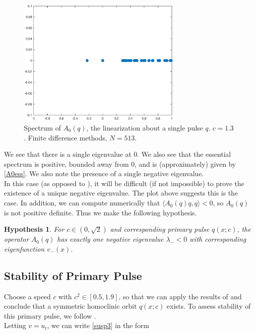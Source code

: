 \documentclass[12pt]{article}
\newtheorem{hypothesis}{Hypothesis}
\begin{document}
\begin{figure}[H]
\centering
\includegraphics[width=8cm]{specA0.eps}
\caption{Spectrum of $A_0(q)$, the linearization about a single pulse $q$. $c = 1.3$. Finite difference methods, $N = 513$.}
\end{figure}

We see that there is a single eigenvalue at 0. We also see that the essential spectrum is positive, bounded away from 0, and is (approximately) given by \eqref{A0ess}. We also note the presence of a single negative eigenvalue.\\

In this case (as opposed to \cite{Sandstede1997}), it will be difficult (if not impossible) to prove the existence of a unique negative eigenvalue. The plot above suggests this is the case. In addition, we can compute numerically that $\langle A_0(q) q, q \rangle < 0$, so $A_0(q)$ is not positive definite. Thus we make the following hypothesis.

\begin{hypothesis}\label{A0neg}
For $c \in (0, \sqrt{2})$ and corresponding primary pulse $q(x; c)$, the operator $A_0(q)$ has exactly one negative eigenvalue $\lambda_- < 0$ with corresponding eigenfunction $v_-(x)$.
\end{hypothesis}

\subsection{Stability of Primary Pulse}

Choose a speed $c$ with $c^2 \in [0.5, 1.9]$, so that we can apply the results of \cite{Berg2018} and conclude that a symmetric homoclinic orbit $q(x; c)$ exists. To assess stability of this primary pulse, we follow \cite{Grillakis1987}.\\

Letting $v = u_t$, we can write \eqref{susp3} in the form 
\end{document}
